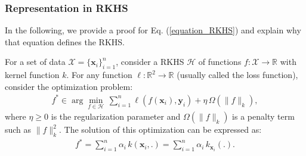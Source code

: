 \documentclass[lang=cn,10pt]{gorgeousnbook}
\numberwithin{equation}{section}%
\numberwithin{figure}{section}%
\begin{document}
\subsubsection{Representation in RKHS}

In the following, we provide a proof for Eq. (\ref{equation_RKHS}) and explain why that equation defines the RKHS. 
\begin{theorem}\label{theorem_representer_theorem}
For a set of data $\mathcal{X} = \{\boldsymbol{x}_i\}_{i=1}^n$, consider a RKHS $\mathcal{H}$ of functions $f: \mathcal{X} \rightarrow \mathbb{R}$ with kernel function $k$.
For any function $\ell: \mathbb{R}^2 \rightarrow \mathbb{R}$ (usually called the loss function), consider the optimization problem:
\begin{align}
f^* \in \arg\min_{f \in \mathcal{H}}\, \sum_{i=1}^n \ell(f(\boldsymbol{x}_i), \boldsymbol{y}_i) + \eta\, \Omega(\|f\|_k),
\end{align}
where $\eta \geq 0$ is the regularization parameter and $\Omega(\|f\|_k)$ is a penalty term such as $\|f\|_k^2$. 
The solution of this optimization can be expressed as:
\begin{align}\label{equation_representer_theorem}
f^* = \sum_{i=1}^n \alpha_i\, k(\boldsymbol{x}_i, .) = \sum_{i=1}^n \alpha_i\, k_{\boldsymbol{x}_i}(.).
\end{align}
\end{theorem}
\end{document}
